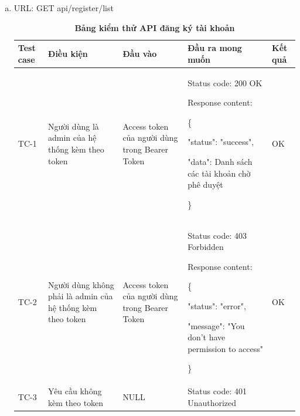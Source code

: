 \begin{enumerate}[a)]
  \item URL: GET api/register/list
  
\break

  \begin{xltabular}{\textwidth}{
    | >{\raggedright\arraybackslash}p{1cm}
    | >{\raggedright\arraybackslash}p{2.5cm}
    | >{\raggedright\arraybackslash}p{3.5cm}
    | >{\raggedright\arraybackslash}X
    | >{\raggedright\arraybackslash}p{1cm}|
    }
    \caption{\bfseries \fontsize{12pt}{0pt}\selectfont Bảng kiểm thử API đăng ký tài khoản}
    \\
    \hline
    \bfseries Test case    &\bfseries Điều kiện   &\bfseries Đầu vào 
    &\bfseries Đầu ra mong muốn &\bfseries Kết quả\\ \hline
  
  
    TC-1
    & Người dùng là admin của hệ thống kèm theo token
    & Access token của người dùng trong Bearer Token
  
    & 
  
    Status code: 200 OK
  
      Response content:
  
      \{
  
    "status": "success",
  
    "data": Danh sách các tài khoản chờ phê duyệt
  
    \}
    
    & OK
  
    \\ \hline
  
    TC-2
    & Người dùng không phải là admin của hệ thống kèm theo token
    & Access token của người dùng trong Bearer Token
  
    & 
  
    Status code: 403 Forbidden
  
      Response content:
  
      \{
  
    "status": "error",
  
    "message": "You don't have permission to access"
  
    \}
    
    & OK
  
    \\ \hline
    TC-3
    & Yêu cầu không kèm theo token
    & NULL
  
    & 
  
    Status code: 401 Unauthorized  
  

\end{xltabular}
\end{enumerate}
